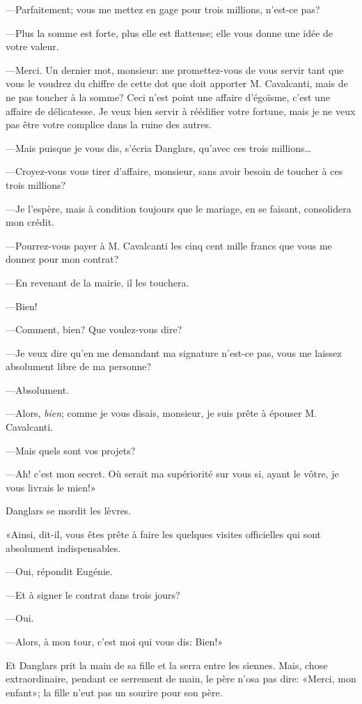 —Parfaitement; vous me mettez en gage pour trois millions, n'est-ce pas? 

—Plus la somme est forte, plus elle est flatteuse; elle vous donne une idée de votre valeur. 

—Merci. Un dernier mot, monsieur: me promettez-vous de vous servir tant que vous le voudrez du chiffre de cette dot que doit apporter M. Cavalcanti, mais de ne pas toucher à la somme? Ceci n'est point une affaire d'égoïsme, c'est une affaire de délicatesse. Je veux bien servir à réédifier votre fortune, mais je ne veux pas être votre complice dans la ruine des autres. 

—Mais puisque je vous dis, s'écria Danglars, qu'avec ces trois millions\dots 

—Croyez-vous vous tirer d'affaire, monsieur, sans avoir besoin de toucher à ces trois millions? 

—Je l'espère, mais à condition toujours que le mariage, en se faisant, consolidera mon crédit. 

—Pourrez-vous payer à M. Cavalcanti les cinq cent mille francs que vous me donnez pour mon contrat? 

—En revenant de la mairie, il les touchera. 

—Bien! 

—Comment, bien? Que voulez-vous dire? 

—Je veux dire qu'en me demandant ma signature n'est-ce pas, vous me laissez absolument libre de ma personne? 

—Absolument. 

—Alors, \textit{bien}; comme je vous disais, monsieur, je suis prête à épouser M. Cavalcanti. 

—Mais quels sont vos projets? 

—Ah! c'est mon secret. Où serait ma supériorité sur vous si, ayant le vôtre, je vous livrais le mien!» 

Danglars se mordit les lèvres. 

«Ainsi, dit-il, vous êtes prête à faire les quelques visites officielles qui sont absolument indispensables. 

—Oui, répondit Eugénie. 

—Et à signer le contrat dans trois jours? 

—Oui. 

—Alors, à mon tour, c'est moi qui vous dis: Bien!» 

Et Danglars prit la main de sa fille et la serra entre les siennes. Mais, chose extraordinaire, pendant ce serrement de main, le père n'osa pas dire: «Merci, mon enfant»; la fille n'eut pas un sourire pour son père. 

